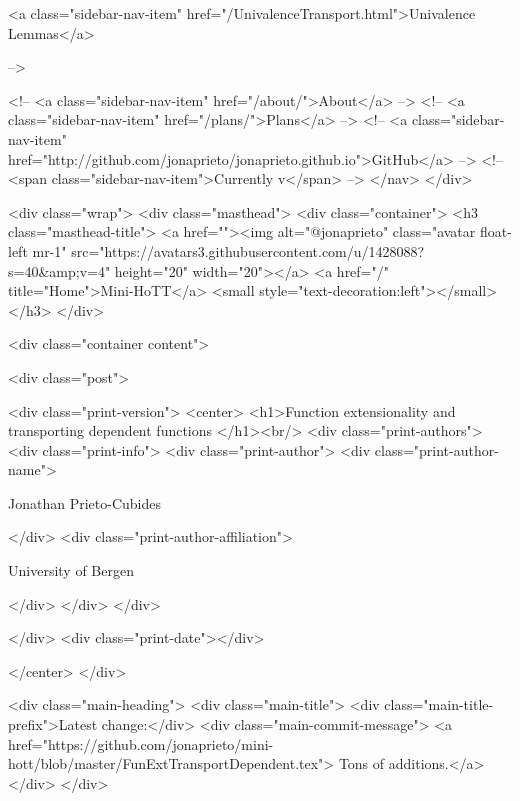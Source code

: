       
    
      
        
          <a class="sidebar-nav-item" href="/UnivalenceTransport.html">Univalence Lemmas</a>
        
      
     -->

    <!-- <a class="sidebar-nav-item" href="/about/">About</a> -->
    <!-- <a class="sidebar-nav-item" href="/plans/">Plans</a> -->
    <!-- <a class="sidebar-nav-item" href="http://github.com/jonaprieto/jonaprieto.github.io">GitHub</a> -->
    <!-- <span class="sidebar-nav-item">Currently v</span> -->
  </nav>
</div>

    <div class="wrap">
      <div class="masthead">
        <div class="container">
          <h3 class="masthead-title">
            <a href=""><img alt="@jonaprieto" class="avatar float-left mr-1" src="https://avatars3.githubusercontent.com/u/1428088?s=40&amp;v=4" height="20" width="20"></a>
            <a href="/" title="Home">Mini-HoTT</a>
            <small style="text-decoration:left"></small>
          </h3>
        </div>
      
      <div class="container content">
        







<div class="post">

  <div class="print-version">
    <center>
      <h1>Function extensionality and transporting dependent functions </h1><br/>
        <div class="print-authors">
          <div class="print-info">
            <div class="print-author">
              <div class="print-author-name">
                
                  Jonathan Prieto-Cubides
                
              </div>
              <div class="print-author-affiliation">
                
                  University of Bergen
                
                </div>
            </div>
          </div>
          
          
        </div>
        <div class="print-date"></div>
        
        
    </center>
  </div>

  
  <div class="main-heading">
    <div class="main-title">
      <div class="main-title-prefix">Latest change:</div>
      <div class="main-commit-message">
            <a href="https://github.com/jonaprieto/mini-hott/blob/master/FunExtTransportDependent.tex">
              Tons of additions.</a>
      </div>
    </div>

